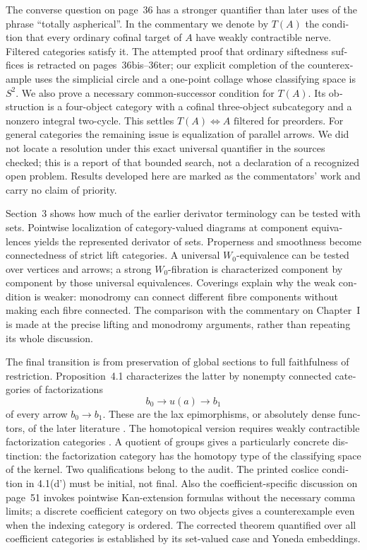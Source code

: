 \begin{otherlanguage}{english}
The converse question on page~36 has a stronger quantifier than later uses of the phrase ``totally aspherical''. In the commentary we denote by $T(A)$ the condition that every ordinary cofinal target of $A$ have weakly contractible nerve. Filtered categories satisfy it. The attempted proof that ordinary siftedness suffices is retracted on pages~36bis--36ter; our explicit completion of the counterexample uses the simplicial circle and a one-point collage whose classifying space is $S^2$. We also prove a necessary common-successor condition for $T(A)$. Its obstruction is a four-object category with a cofinal three-object subcategory and a nonzero integral two-cycle. This settles $T(A)\Leftrightarrow A\text{ filtered}$ for preorders. For general categories the remaining issue is equalization of parallel arrows. We did not locate a resolution under this exact universal quantifier in the sources checked; this is a report of that bounded search, not a declaration of a recognized open problem. Results developed here are marked as the commentators' work and carry no claim of priority.

Section~3 shows how much of the earlier derivator terminology can be tested with sets. Pointwise localization of category-valued diagrams at component equivalences yields the represented derivator of sets. Properness and smoothness become connectedness of strict lift categories. A universal $W_0$-equivalence can be tested over vertices and arrows; a strong $W_0$-fibration is characterized component by component by those universal equivalences. Coverings explain why the weak condition is weaker: monodromy can connect different fibre components without making each fibre connected. The comparison with the commentary on Chapter~I is made at the precise lifting and monodromy arguments, rather than repeating its whole discussion.

The final transition is from preservation of global sections to full faithfulness of restriction. Proposition~4.1 characterizes the latter by nonempty connected categories of factorizations
\[
 b_0\longrightarrow u(a)\longrightarrow b_1
\]
of every arrow $b_0\to b_1$. These are the lax epimorphisms, or absolutely dense functors, of the later literature \citep{AdamekElBashirSobralVelebil2001}. The homotopical version requires weakly contractible factorization categories \citep[Theorem~6.10]{GrothStovicek2016Trees}. A quotient of groups gives a particularly concrete distinction: the factorization category has the homotopy type of the classifying space of the kernel. Two qualifications belong to the audit. The printed coslice condition in 4.1(d') must be initial, not final. Also the coefficient-specific discussion on page~51 invokes pointwise Kan-extension formulas without the necessary comma limits; a discrete coefficient category on two objects gives a counterexample even when the indexing category is ordered. The corrected theorem quantified over all coefficient categories is established by its set-valued case and Yoneda embeddings.


\end{otherlanguage}
